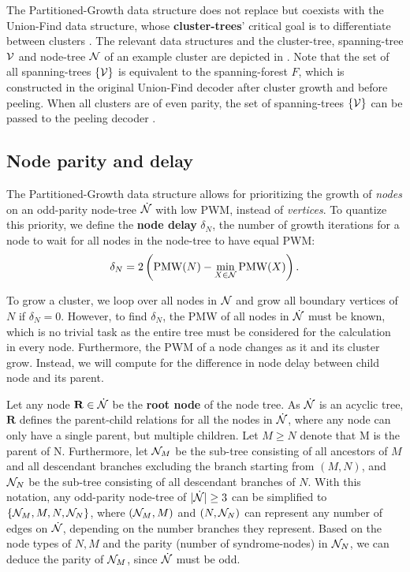The Partitioned-Growth data structure does not replace but coexists with the Union-Find data structure, whose \textbf{cluster-trees}' critical goal is to differentiate between clusters \cite{delfosse2017almost}. The relevant data structures and the cluster-tree, spanning-tree $\mathcal{V}$ and node-tree $\mathcal{N}$ of an example cluster are depicted in . Note that the set of all spanning-trees $\{\mathcal{V}\}$ is equivalent to the spanning-forest $F$, which is constructed in the original Union-Find decoder after cluster growth and before peeling. When all clusters are of even parity, the set of spanning-trees $\{\mathcal{V}\}$ can be passed to the peeling decoder \cite{delfosse2017linear}. 


\subsection{Node parity and delay}\label{sec:paritydelay}

The Partitioned-Growth data structure allows for prioritizing the growth of \emph{nodes} on an odd-parity node-tree $\dot{\mathcal{N}}$ with low PWM, instead of \emph{vertices}. To quantize this priority, we define the \textbf{node delay} $\delta_N$, the number of growth iterations for a node to wait for all nodes in the node-tree to have equal PWM: 
\begin{equation}\label{eq:delayequation}
    \delta_N = 2\left(\text{PMW}(N) - \min_{X\in\mathcal{N}}{\text{PMW}(X)}\right).
\end{equation}

To grow a cluster, we loop over all nodes in $\mathcal{N}$ and grow all boundary vertices of $N$ if $\delta_N=0$. However, to find $\delta_N$, the PMW of all nodes in $\dot{\mathcal{N}}$ must be known, which is no trivial task as the entire tree must be considered for the calculation in every node. Furthermore, the PWM of a node changes as it and its cluster grow. Instead, we will compute for the difference in node delay between child node and its parent. 

Let any node $\mathbf{R}\in\dot{\mathcal{N}}$ be the \textbf{root node} of the node tree. As $\dot{\mathcal{N}}$ is an acyclic tree, $\mathbf{R}$ defines the parent-child relations for all the nodes in $\dot{\mathcal{N}}$, where any node can only have a single parent, but multiple children. Let $M\geq N$ denote that M is the parent of N. Furthermore, let $\mathcal{N}_M$ be the sub-tree consisting of all ancestors of $M$ and all descendant branches excluding the branch starting from $(M,N)$, and $\mathcal{N}_N$ be the sub-tree consisting of all descendant branches of $N$. With this notation, any odd-parity node-tree of $\lvert\dot{\mathcal{N}}\rvert\geq 3$ can be simplified to $\{\mathcal{N}_M,M,N,\mathcal{N}_N\}$, where $(\mathcal{N}_M, M)$ and $(N, \mathcal{N}_N)$ can represent any number of edges on $\dot{\mathcal{N}}$, depending on the number branches they represent. Based on the node types of $N, M$ and the parity (number of syndrome-nodes) in $\mathcal{N}_N$, we can deduce the parity of $\mathcal{N}_M$, since $\dot{\mathcal{N}}$ must be odd. 

